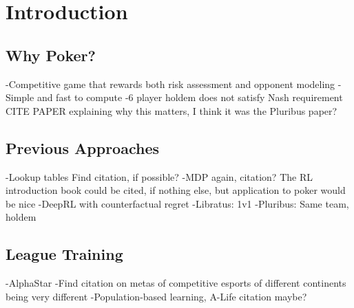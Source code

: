 \chapter{Introduction}
\section{Why Poker?}
-Competitive game that rewards both risk assessment and opponent modeling
-Simple and fast to compute
-6 player holdem does not satisfy Nash requirement {CITE PAPER explaining why this matters, I think it was the Pluribus paper?}
\section{Previous Approaches}
-Lookup tables {Find citation, if possible?}
-MDP {again, citation? The RL introduction book could be cited, if nothing else, but application to poker would be nice}
-DeepRL with counterfactual regret
    -Libratus: 1v1
    -Pluribus: Same team, holdem
\section{League Training}
-AlphaStar
-{Find citation on metas of competitive esports of different continents being very different}
-Population-based learning, A-Life citation maybe?